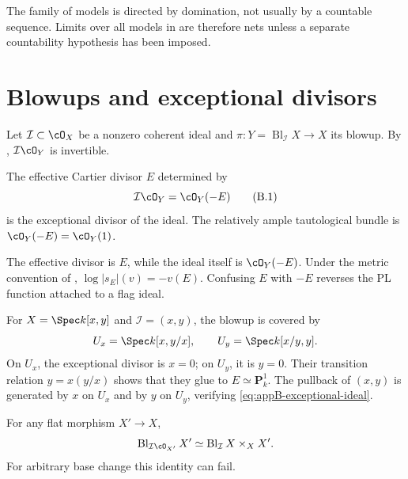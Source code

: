 \begin{remark}[Checkpoint]
\label{rem:appB-model-nets}
The family of models is directed by domination, not usually by a countable
sequence.  Limits over all models in
 are therefore nets unless a separate
countability hypothesis has been imposed.
\end{remark}

\section{Blowups and exceptional divisors}
\label{sec:appB-blowups}

Let \(\mathcal I\subset\cO_X\) be a nonzero coherent ideal and
\(\pi:Y=\operatorname{Bl}_{\mathcal I}X\to X\) its blowup.  By
,
\(\mathcal I\cO_Y\) is invertible.

\begin{definition}
\label{def:appB-exceptional-divisor}
The effective Cartier divisor \(E\) determined by
\[
 \mathcal I\cO_Y=\cO_Y(-E)
\tag{B.1}\label{eq:appB-exceptional-ideal}
\]
is the exceptional divisor of the ideal.  The relatively ample
tautological bundle is \(\cO_Y(-E)=\cO_Y(1)\).
\end{definition}

\begin{remark}
\label{rem:appB-blowup-sign}
The effective divisor is \(E\), while the ideal itself is
\(\cO_Y(-E)\).  Under the metric convention of
,
\(\log|s_E|(v)=-v(E)\).  Confusing \(E\) with \(-E\) reverses the PL
function attached to a flag ideal.
\end{remark}

\begin{example}
\label{ex:appB-blowup-plane}
For \(X=\Spec k[x,y]\) and \(\mathcal I=(x,y)\), the blowup is covered by
\[
 U_x=\Spec k[x,y/x],
 \qquad
 U_y=\Spec k[x/y,y].
\]
On \(U_x\), the exceptional divisor is \(x=0\); on \(U_y\), it is
\(y=0\).  Their transition relation \(y=x(y/x)\) shows that they glue to
\(E\simeq\mathbf P^1_k\).  The pullback of \((x,y)\) is generated by
\(x\) on \(U_x\) and by \(y\) on \(U_y\), verifying
\eqref{eq:appB-exceptional-ideal}.
\end{example}

\begin{proposition}\label{prop:appB-blowup-base-change}
For any flat morphism \(X'\to X\),
\[
 \operatorname{Bl}_{\mathcal I\cO_{X'}}X'
 \simeq
 \operatorname{Bl}_{\mathcal I}X\times_XX'.
\]
For arbitrary base change this identity can fail.
\end{proposition}


